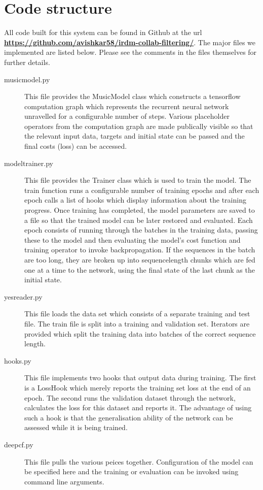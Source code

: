\documentclass{article} %
\begin{document}
\section{Code structure}
All code built for this system can be found in Github at the url \textbf{\url{https://github.com/avishkar58/irdm-collab-filtering/}}. The major files we implemented are listed below. Please see the comments in the files themselves for further details. 
\begin{description}
\item [musicmodel.py] This file provides the MusicModel class which constructs a tensorflow computation graph which represents the recurrent neural network unravelled for a configurable number of steps. Various placeholder operators from the computation graph are made publically visible so that the relevant input data, targets and initial state can be passed and the final costs (loss) can be accessed.
\item [modeltrainer.py] This file provides the Trainer class which is used to train the model. The train function runs a configurable number of training epochs and after each epoch calls a list of hooks which display information about the training progress. Once training has completed, the model parameters are saved to a file so that the trained model can be later restored and evaluated. Each epoch consists of running through the batches in the training data, passing these to the model and then evaluating the model's cost function and training operator to invoke backpropagation. If the sequences in the batch are too long, they are broken up into sequence\textunderscore length chunks which are fed one at a time to the network, using the final state of the last chunk as the initial state.
\item [yes\textunderscore reader.py] This file loads the data set which consists of a separate training and test file. The train file is split into a training and validation set. Iterators are provided which split the training data into batches of the correct sequence length. 
\item [hooks.py] This file implements two hooks that output data during training. The first is a LossHook which merely reports the training set loss at the end of an epoch. The second runs the validation dataset through the network, calculates the loss for this dataset and reports it. The advantage of using such a hook is that the generalisation ability of the network can be assessed while it is being trained. 
\item [deepcf.py] This file pulls the various peices together. Configuration of the model can be specified here and the training or evaluation can be invoked using command line arguments.
\end{description}
\end{document}
